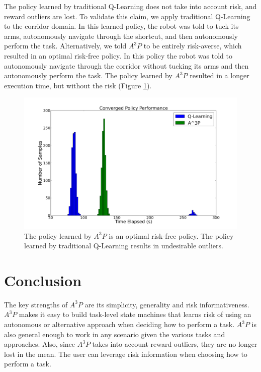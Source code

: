 \documentclass[letterpaper, 10 pt, conference]{ieeeconf}  %
\begin{document}
The policy learned by traditional Q-Learning does not take into account risk, and reward outliers are lost. To validate this claim, we apply traditional Q-Learning to the corridor domain. In this learned policy, the robot was told to tuck its arms, autonomously navigate through the shortcut, and then autonomously perform the task. Alternatively, we told $A^3P$ to be entirely risk-averse, which resulted in an optimal risk-free policy. In this policy the robot was told to autonomously navigate through the corridor without tucking its arms and then autonomously perform the task. The policy learned by $A^3P$ resulted in a longer execution time, but without the risk (Figure \ref{policy_hist}).

\begin{figure}
\centering
\includegraphics[width=1.0\columnwidth]{policy_hist}
\caption{The policy learned by $A^3P$ is an optimal risk-free policy. The policy learned by traditional Q-Learning results in undesirable outliers.}
\label{policy_hist}
\end{figure}

\section{Conclusion}

The key strengths of $A^3P$ are its simplicity, generality and risk informativeness. $A^3P$ makes it easy to build task-level state machines that learns risk of using an autonomous or alternative approach when deciding how to perform a task. $A^3P$ is also general enough to work in any scenario given the various tasks and approaches.  Also, since $A^3P$ takes into account reward outliers, they are no longer lost in the mean. The user can leverage risk information when choosing how to perform a task.
\end{document}
